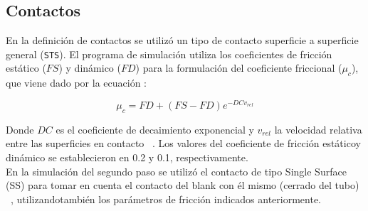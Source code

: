 \subsection{Contactos}

En la definición de contactos se utilizó un tipo de contacto superficie a superficie
general (\texttt{STS}). El programa de simulación utiliza los coeficientes de fricción 
estático ($FS$) y dinámico ($FD$) para la formulación del coeficiente friccional ($\mu_c$),
que viene dado por la ecuación :

\begin{equation}
\mu_c = FD + (FS - FD) e^{-DCv_{rel}}
\label{eq:frictional_coeff}
\end{equation}

Donde $DC$ es el coeficiente de decaimiento exponencial y $v_{rel}$ la velocidad relativa
entre las superficies en contacto ~\cite{lsdyna-manual}. Los valores del coeficiente de 
fricción estáticoy dinámico se establecieron en 0.2 y 0.1, respectivamente. ~\cite{carvill1993} \\

En la simulación del segundo paso se utilizó el contacto de tipo Single Surface (SS) para 
tomar en cuenta el contacto del blank con él mismo (cerrado del tubo) ~\cite{lsdyna-manual}, 
utilizandotambién los parámetros de fricción indicados anteriormente.






